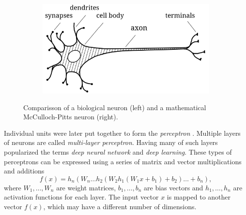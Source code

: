 \begin{figure}[ht]
    \centering
    \begin{subfigure}{0.49\textwidth}
        \raggedright
        \includegraphics[width=\textwidth]{assets/bio_neuron.pdf}
    \end{subfigure}
    \begin{subfigure}{0.5\textwidth}
        \raggedleft
    \end{subfigure}
    \caption{Comparisson of a biological neuron \cite{bio-neuron} (left) and a mathematical McCulloch-Pitts neuron (right).}
    \label{fig:neuron}
\end{figure}
Individual units were later put together to form the \textit{perceptron} \cite{first-perceptron}. Multiple layers of neurons are called \textit{multi-layer perceptron}. Having many of such layers popularized the terms \textit{deep neural network} and \textit{deep learning}. These types of perceptrons can be expressed using a series of matrix and vector multiplications and additions
\begin{equation*}
    f(x) = h_n \left(W_n \dots h_2\left( W_2 h_1(W_1x + b_1) + b_2 \right) \dots + b_n\right),
\end{equation*}
where $W_1, \dots, W_n$ are weight matrices, $b_1, \dots, b_n$ are bias vectors and $h_1, \dots, h_n$ are activation functions for each layer. The input vector $x$ is mapped to another vector $f(x)$, which may have a different number of dimensions.

